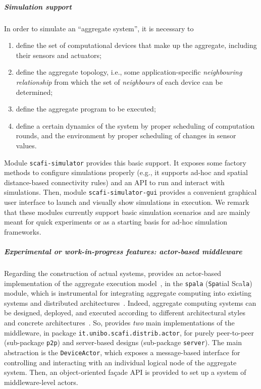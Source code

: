 \subparagraph*{Simulation support}
%
In order to simulate an ``aggregate system'',
 it is necessary 
 to 
\begin{enumerate}
  \item define the set of computational devices that make up the aggregate, including their sensors and actuators;
  \item define the aggregate topology, i.e., 
  some application-specific \emph{neighbouring relationship}
  from which the set of \emph{neighbours}
  of each device can be determined;
  \item define the aggregate program to be executed;
  \item define a certain dynamics of the system
  by proper scheduling of computation rounds,
  and the environment
  by proper scheduling of changes in sensor values.
\end{enumerate}

%
Module \texttt{scafi-simulator}
 provides this basic support.
%
It exposes some factory methods
to configure simulations properly
 (e.g., it supports ad-hoc and spatial distance-based connectivity rules)
 and an API to run and interact with simulations.
%
Then, module \texttt{scafi-simulator-gui}
 provides a convenient graphical user interface
 to launch and visually show simulations in execution.
%
We remark that these modules currently support basic simulation scenarios
 and are mainly meant for quick experiments
 or as a starting basis for ad-hoc simulation frameworks.
 
\subparagraph*{Experimental or work-in-progress features: actor-based middleware}
%
Regarding the construction of actual systems, 
 \scafi{}
 provides
 an actor-based implementation
 of the aggregate execution model~\cite{DBLP:series/lncs/CasadeiV18},
 in the \texttt{spala} (\texttt{Spa}tial Sca\texttt{la}) module,
 which is instrumental for integrating aggregate computing
 into existing systems and distributed architectures~\cite{DBLP:series/lncs/CasadeiV18}.
%
Indeed, aggregate computing systems
 can be designed, deployed, and executed 
 according to different
 architectural styles 
 and concrete architectures~\cite{DBLP:journals/fi/CasadeiPPVW20}.
%
So, \scafi{} provides \emph{two} main implementations of the middleware,
 in package \texttt{it.unibo.scafi.distrib.actor},
 for purely peer-to-peer 
 (sub-package \texttt{p2p})
 and server-based designs
 (sub-package \texttt{server}).
%
The main abstraction
 is the \texttt{DeviceActor},
 which exposes a message-based interface
 for controlling and interacting with
 an individual logical node of the aggregate system.
%
Then, an object-oriented façade API is provided to set up a system of middleware-level actors. 

